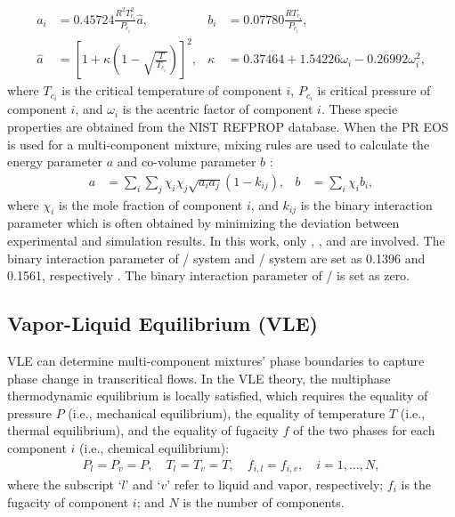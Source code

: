 \begin{align}
    a_i &= 0.45724\frac{R^2 T_{c_i}^2}{P_{c_i}} \hat{a} , &b_i&=0.07780\frac{RT_{c_i}}{P_{c_i}} \label{eq:ab},\\
    \hat{a}&=\left[1+\kappa\left(1-\sqrt{\frac{T}{T_{c_i}}}\right)\right]^2, &\kappa&=0.37464+1.54226\omega_i-0.26992\omega_i^2,
\end{align}
where $T_{c_i}$ is the critical temperature of component $i$, $P_{c_i}$ is critical pressure of component $i$, and $\omega_i$ is the acentric factor of component $i$. These specie properties are obtained from the NIST REFPROP database. When the PR EOS is used for a multi-component mixture, mixing rules are used to calculate the energy parameter $a$ and co-volume parameter $b$ \cite{reid1977properties}:
\begin{align}
a&=\sum_i\sum_j\chi_i\chi_j\sqrt{a_ia_j}(1-k_{ij}),& b&=\sum_i\chi_i b_i,\label{eq:mix}
\end{align}
where $\chi_i$ is the mole fraction of component $i$, and $k_{ij}$ is the binary interaction parameter which is often obtained by minimizing the deviation between experimental and simulation results. In this work, only , , and  are involved. The binary interaction parameter of / system and / system are set as 0.1396 and 0.1561, respectively \cite{eliosa2009vapor,garcia2011vapor}. The binary interaction parameter of / is set as zero.

\subsection{Vapor-Liquid Equilibrium (VLE)}
VLE can determine multi-component mixtures' phase boundaries to capture phase change in transcritical flows. In the VLE theory, the multiphase thermodynamic equilibrium is locally satisfied, which requires the equality of pressure $P$ (i.e., mechanical equilibrium), the equality of temperature $T$ (i.e., thermal equilibrium), and the equality of fugacity $f$ of the two phases for each component $i$ (i.e., chemical equilibrium):
\begin{align}
P_l=P_v=P,\quad T_l=T_v=T,\quad f_{i,l}=f_{i,v},\quad i=1,...,N, \label{eq:eq}
\end{align}
where the subscript `$l$' and `$v$' refer to liquid and vapor, respectively; $f_i$ is the fugacity of component $i$; and $N$ is the number of components.

